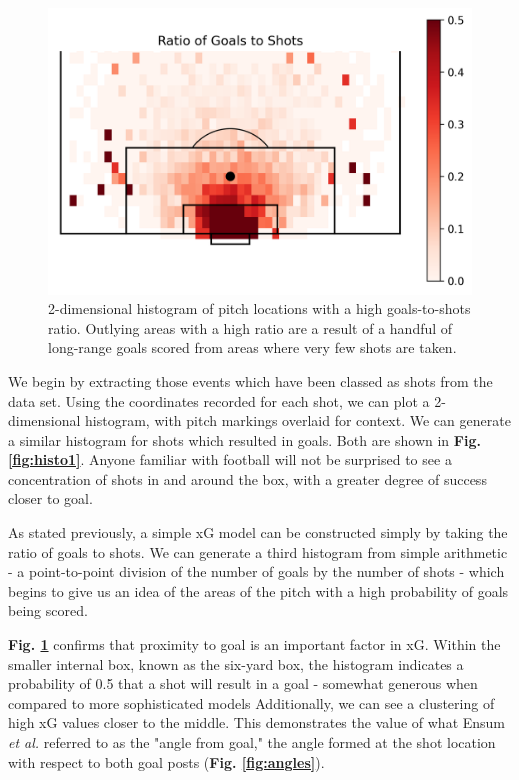 \documentclass{l4proj}
\begin{document}
\begin{figure}[h]
    \centering
    \includegraphics[scale=0.6]{images/xgplot1.png}   
    \caption{2-dimensional histogram of pitch locations with a high goals-to-shots ratio. Outlying areas with a high ratio are a result of a handful of long-range goals scored from areas where very few shots are taken.}
    \label{fig:xg1} 
\end{figure}

We begin by extracting those events which have been classed as shots from the data set. Using the coordinates recorded for each shot, we can plot a 2-dimensional histogram, with pitch markings overlaid for context. We can generate a similar histogram for shots which resulted in goals. Both are shown in \textbf{Fig. \ref{fig:histo1}}. Anyone familiar with football will not be surprised to see a concentration of shots in and around the box, with a greater degree of success closer to goal.

As stated previously, a simple xG model can be constructed simply by taking the ratio of goals to shots. We can generate a third histogram from simple arithmetic - a point-to-point division of the number of goals by the number of shots - which begins to give us an idea of the areas of the pitch with a high probability of goals being scored. 

\textbf{Fig. \ref{fig:xg1}} confirms that proximity to goal is an important factor in xG. Within the smaller internal box, known as the six-yard box, the histogram indicates a probability of 0.5 that a shot will result in a goal - somewhat generous when compared to more sophisticated models \cite{sump1} Additionally, we can see a clustering of high xG values closer to the middle. This demonstrates the value of what Ensum \textit{et al.} referred to as the "angle from goal," the angle formed at the shot location with respect to both goal posts (\textbf{Fig. \ref{fig:angles}}).
\end{document}
